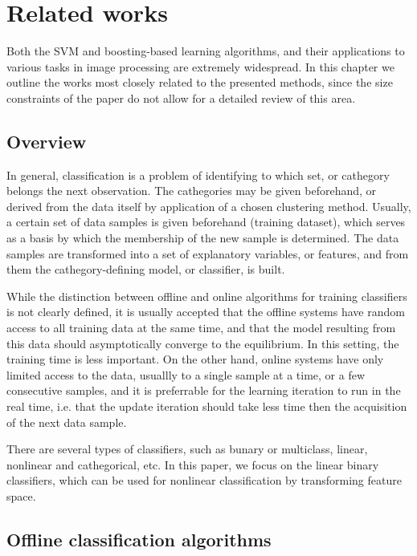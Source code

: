 
\chapter{Related works} %
\label{Chap2}
Both the SVM and boosting-based learning algorithms, and their applications to various tasks in image processing are extremely widespread. In this chapter we outline the works most closely related to the presented methods, since the size constraints of the paper do not allow for a detailed review of this area. 
\section{Overview}
In general, classification is a problem of identifying to which set, or cathegory belongs the next observation. The cathegories may be given beforehand, or derived from the data itself by application of a chosen clustering method. Usually, a certain set of data samples is given beforehand (training dataset), which serves as a basis by which the membership of the new sample is determined. The data samples are transformed into a set of explanatory variables, or features, and from them the cathegory-defining model, or classifier, is built.

While the distinction between offline and online algorithms for training classifiers is not clearly defined, it is usually accepted that the offline systems have random access to all training data at the same time, and that the model resulting from this data should asymptotically converge to the equilibrium. In this setting, the training time is less important.  On the other hand, online systems have only limited access to the data, usuallly to a single sample at a time, or a few consecutive samples, and it is preferrable for the learning iteration to run in the real time, i.e. that the update iteration should take less time then the acquisition of the next data sample. 

There are several types of classifiers, such as bunary or multiclass, linear, nonlinear and cathegorical, etc. In this paper, we focus on the linear binary classifiers, which can be used for nonlinear classification by transforming feature space. 
\section{Offline classification algorithms}

